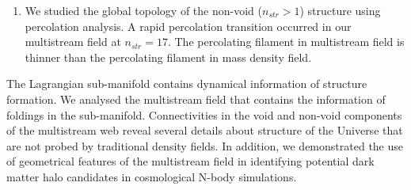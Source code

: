 \begin{enumerate}

\item We studied the global topology of the non-void ($n_{str} > 1$) structure using percolation analysis. A rapid percolation transition occurred in our multistream field at $n_{str} = 17$. The percolating filament in multistream field is thinner than the percolating filament in mass density field. 

\end{enumerate}

The Lagrangian sub-manifold contains dynamical information of structure formation. We analysed the multistream field that contains the information of foldings in the sub-manifold.  Connectivities in the void and non-void components of the multistream web reveal several details about structure of the Universe that are not probed by traditional density fields. In addition, we demonstrated the use of geometrical features of the multistream field in identifying potential dark matter halo candidates in cosmological N-body simulations. 


